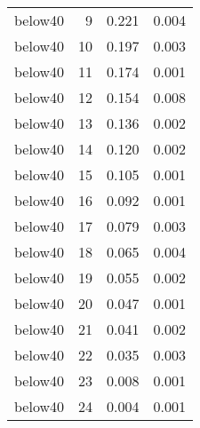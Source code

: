 \begin{table}[!h]
\begin{tabular}[t]{lrrr}
below40 & 9 & 0.221 & 0.004\\
below40 & 10 & 0.197 & 0.003\\
below40 & 11 & 0.174 & 0.001\\
\addlinespace
below40 & 12 & 0.154 & 0.008\\
below40 & 13 & 0.136 & 0.002\\
below40 & 14 & 0.120 & 0.002\\
below40 & 15 & 0.105 & 0.001\\
below40 & 16 & 0.092 & 0.001\\
\addlinespace
below40 & 17 & 0.079 & 0.003\\
below40 & 18 & 0.065 & 0.004\\
below40 & 19 & 0.055 & 0.002\\
below40 & 20 & 0.047 & 0.001\\
below40 & 21 & 0.041 & 0.002\\
\addlinespace
below40 & 22 & 0.035 & 0.003\\
below40 & 23 & 0.008 & 0.001\\
below40 & 24 & 0.004 & 0.001\\
\bottomrule
\end{tabular}
\end{table}
